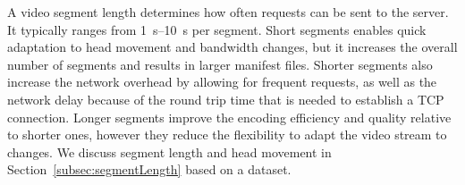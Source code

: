

 A video segment length determines how
often requests can be sent to the server. It typically ranges from
\SIrange{1}{10}{\second} per segment. Short segments enables quick
adaptation to head movement and bandwidth changes, but it increases
the overall number of segments and results in larger manifest files.
Shorter segments also increase the network overhead by allowing for
frequent requests, as well as the network delay because of the round
trip time that is needed to establish a TCP connection.
Longer segments improve the encoding efficiency and quality relative to
shorter ones, however they reduce the flexibility to adapt the video
stream to changes. We discuss segment length and head movement in
Section~\ref{subsec:segmentLength} based on a dataset.



